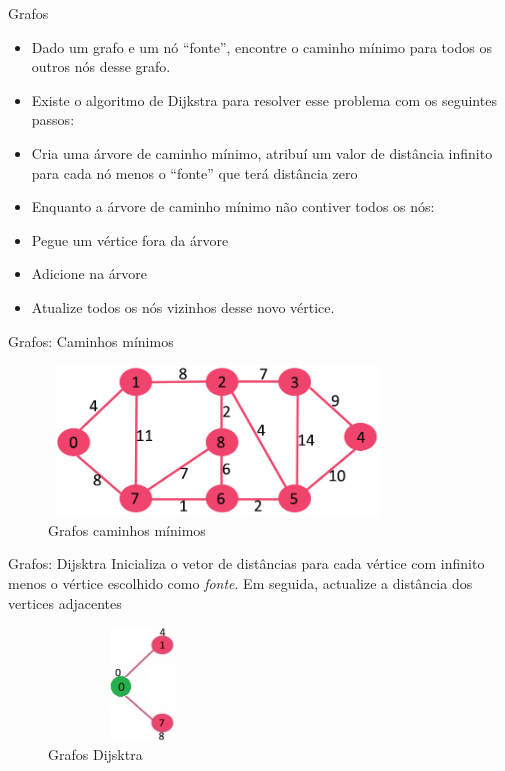 \begin{frame}
	\begin{block}{Grafos}
		\begin{itemize}
			\item Dado um grafo e um nó “fonte”, encontre o caminho mínimo para todos os outros nós desse grafo.
			\item Existe o algoritmo de Dijkstra para resolver esse problema com os seguintes passos:
			\item Cria uma árvore de caminho mínimo, atribuí um valor de distância infinito para cada nó menos o “fonte” que terá distância zero
			\item Enquanto a árvore de caminho mínimo não contiver todos os nós:
			\item Pegue um vértice fora da árvore
			\item Adicione na árvore
			\item Atualize todos os nós vizinhos desse novo vértice.
		\end{itemize}
	\end{block}
\end{frame}

\begin{frame}
	\begin{block}{Grafos: Caminhos mínimos}
		\begin{figure}[!htb]
			\centering	  
			\includegraphics[height=4cm, width = 9cm]{./pic/Fig-11.jpg}
			\caption{Grafos caminhos mínimos \cite{GEEKS_2018}}
		\end{figure}
	\end{block}
\end{frame}

\begin{frame}
	\begin{block}{Grafos: Dijsktra}
		Inicializa o vetor de distâncias para cada vértice com infinito menos o vértice escolhido como \emph{fonte}. Em seguida, actualize a distância dos vertices adjacentes
		\begin{figure}[!htb]
			\centering	  
			\includegraphics[height=3cm, width = 5cm]{./pic/MST1.jpg}
			\caption{Grafos Dijsktra \cite{GEEKS_2018}}
		\end{figure}
	\end{block}
\end{frame}

